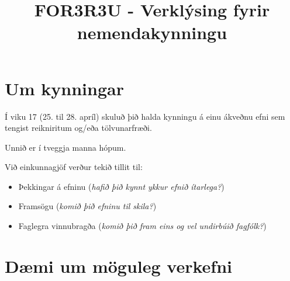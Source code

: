 \documentclass{article}
\title{FOR3R3U - Verklýsing fyrir nemendakynningu}
\begin{document}
\maketitle
\section{Um kynningar}
Í viku 17 (25. til 28. apríl) skuluð þið halda kynningu á einu ákveðnu efni sem tengist reikniritum og/eða tölvunarfræði.

Unnið er í tveggja manna hópum.

Við einkunnagjöf verður tekið tillit til:
\begin{itemize}
 \item Þekkingar á efninu (\emph{hafið þið kynnt ykkur efnið ítarlega?})
 \item Framsögu (\emph{komið þið efninu til skila?})
 \item Faglegra vinnubragða (\emph{komið þið fram eins og vel undirbúið fagfólk?})
\end{itemize}

\section{Dæmi um möguleg verkefni}
\end{document}
